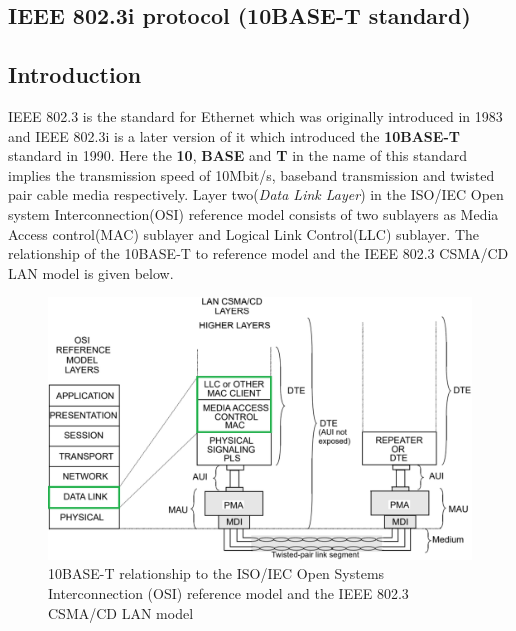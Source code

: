 \documentclass[a4paper,11pt]{article}%
\begin{document}
	

\tableofcontents
\pagebreak


\begin{center}
	\section{IEEE 802.3i protocol (10BASE-T standard)}
\end{center}


\subsection{Introduction}
IEEE 802.3 is the standard for Ethernet which was originally introduced in 1983 and IEEE 802.3i is a later version of it which introduced the \textbf{10BASE-T} standard in 1990. Here the \textbf{10}, \textbf{BASE} and \textbf{T} in the name of this standard implies   the transmission speed of 10Mbit/s, baseband transmission and twisted pair cable media respectively. Layer two(\textit{Data Link Layer}) in the ISO/IEC Open system Interconnection(OSI) reference model consists of two sublayers as Media Access control(MAC) sublayer and Logical Link Control(LLC) sublayer. The relationship of the 10BASE-T to reference model and the IEEE 802.3 CSMA/CD LAN model is given below.




	\begin{figure}[!h]
		\centering
		\includegraphics[scale=0.45]{figures/macllc}
		\caption{10BASE-T relationship to the ISO/IEC Open Systems Interconnection (OSI) reference model and the IEEE 802.3 CSMA/CD LAN model\cite{main}}
	\end{figure}
\end{document}
